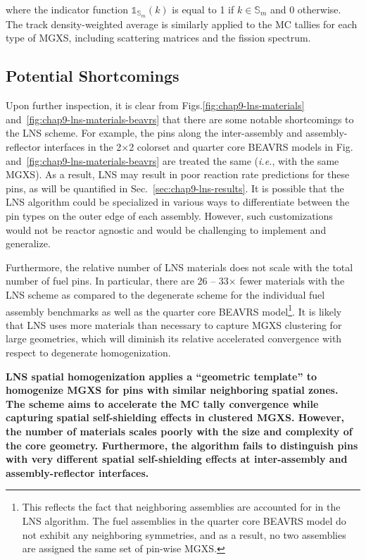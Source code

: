 \noindent where the indicator function $\mathbb{1}_{\mathbb{S}_{m}}(k)$ is equal to 1 if $k \in \mathbb{S}_{m}$ and 0 otherwise. The track density-weighted average is similarly applied to the \ac{MC} tallies for each type of \ac{MGXS}, including scattering matrices and the fission spectrum.

\subsection{Potential Shortcomings}
\label{subsec:chap9-lns-shortcomings}

Upon further inspection, it is clear from Figs.\ref{fig:chap9-lns-materials} and~\ref{fig:chap9-lns-materials-beavrs} that there are some notable shortcomings to the \ac{LNS} scheme. For example, the pins along the inter-assembly and assembly-reflector interfaces in the 2$\times$2 colorset and quarter core \ac{BEAVRS} models in Fig.~ and~\ref{fig:chap9-lns-materials-beavrs} are treated the same (\textit{i.e.}, with the same \ac{MGXS}). As a result, \ac{LNS} may result in poor reaction rate predictions for these pins, as will be quantified in Sec.~\ref{sec:chap9-lns-results}. It is possible that the \ac{LNS} algorithm could be specialized in various ways to differentiate between the pin types on the outer edge of each assembly. However, such customizations would not be reactor agnostic and would be challenging to implement and generalize.

Furthermore, the relative number of \ac{LNS} materials does not scale with the total number of fuel pins. In particular, there are 26 -- 33$\times$ fewer materials with the \ac{LNS} scheme as compared to the degenerate scheme for the individual fuel assembly benchmarks as well as the quarter core \ac{BEAVRS} model\footnote{This reflects the fact that neighboring assemblies are accounted for in the \ac{LNS} algorithm. The fuel assemblies in the quarter core \ac{BEAVRS} model do not exhibit any neighboring symmetries, and as a result, no two assemblies are assigned the same set of pin-wise \ac{MGXS}.}. It is likely that \ac{LNS} uses more materials than necessary to capture \ac{MGXS} clustering for large geometries, which will diminish its relative accelerated convergence with respect to degenerate homogenization.

\begin{emphbox}
\textbf{\ac{LNS} spatial homogenization applies a ``geometric template'' to homogenize \ac{MGXS} for pins with similar neighboring spatial zones. The scheme aims to accelerate the \ac{MC} tally convergence while capturing spatial self-shielding effects in clustered \ac{MGXS}. However, the number of materials scales poorly with the size and complexity of the core geometry. Furthermore, the algorithm fails to distinguish pins with very different spatial self-shielding effects at inter-assembly and assembly-reflector interfaces.}
\end{emphbox}


